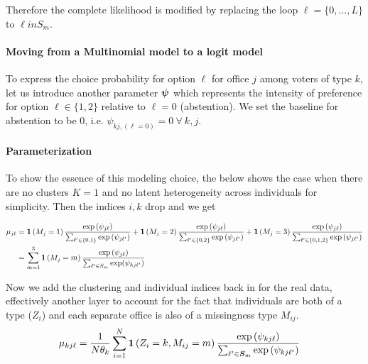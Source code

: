 \documentclass[11pt]{article}
\begin{document}
Therefore the complete likelihood is modified by replacing the loop \(\ell = \{0, ..., L\}\) to \(\ell in S_m\).


\paragraph{Moving from a Multinomial model to a logit model} To express the choice probability for option \(\ell\) for office \(j\) among voters of type \(k\), let us introduce another parameter \(\bm{\psi}\) which represents the intensity of preference for option \(\ell \in \{1, 2\}\) relative to \(\ell = 0\) (abstention). We set the baseline for abstention to be 0, i.e. \(\psi_{kj,(\ell=0)} = 0 ~\forall~ k, j\).  


\paragraph{Parameterization} To show the essence of this modeling choice, the below shows the case when there are no clusters \(K = 1\) and no latent heterogeneity across individuals for simplicity. Then the indices \(i, k\) drop and we get

\begin{align}
\mu_{j\ell} &= \bm{1}\left(M_{j}= 1\right)\frac{\exp{(\psi_{j\ell}})}{\sum_{\ell^\prime \in \{0, 1\}}\exp{(\psi_{j\ell^\prime})}} +\bm{1}\left(M_{j}= 2\right)\frac{\exp{(\psi_{j\ell})}}{\sum_{\ell^\prime \in \{0, 2\}}\exp{(\psi_{j\ell^\prime}})}\nonumber +\bm{1}\left(M_{j}= 3\right)\frac{\exp{(\psi_{j\ell}})}{\sum_{\ell^\prime \in \{0, 1, 2\}}\exp{(\psi_{j\ell^\prime}})}\nonumber\\
&= \sum_{m = 1}^{3}\bm{1}\left(M_{j}= m\right)\frac{\exp{(\psi_{j\ell})}}{\sum_{\ell^\prime \in S_m}\exp(\psi_{kj\ell^\prime})}\nonumber
\end{align}

Now we add the clustering and individual indices back in for the real data, effectively another layer to account for the fact that individuals are both of a type (\(Z_i\)) and each separate office is also of a missingness type \(M_{ij}\). 
\begin{align}
\mu_{kj\ell} &= \frac{1}{N\theta_k}\sum^N_{i = 1}\bm{1}\left(Z_i = k, M_{ij}= m\right)\frac{\exp{(\psi_{kj\ell})}}{\sum_{\ell^\prime \in \bm{S}_{m}}\exp{(\psi_{kj\ell^\prime})}}\label{eq:missing}
\end{align}





\end{document}
